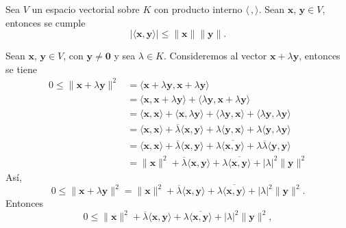 \begin{theorem}{}{}
     Sea $V$ un espacio vectorial sobre $K$ con producto interno $\langle \, , \rangle$. Sean $\mathbf{x}$, $\mathbf{y} \in V$, entonces se cumple
    $$| \langle \mathbf{x}, \mathbf{y} \rangle | \leq \| \mathbf{x} \| \| \mathbf{y} \|.$$

    \tcblower
    \demostracion Sean $\mathbf{x}$, $\mathbf{y} \in V$, con $\mathbf{y} \neq \mathbf{0}$ y sea $\lambda \in K$. Consideremos al vector $\mathbf{x} + \lambda \mathbf{y}$, entonces se tiene
    \begin{align*}
        0 \leq \| \mathbf{x} + \lambda \mathbf{y} \|^2 & = \langle \mathbf{x} + \lambda\mathbf{y}, \mathbf{x} + \lambda\mathbf{y} \rangle \\
        & = \langle \mathbf{x}, \mathbf{x} + \lambda \mathbf{y} \rangle + \langle \lambda \mathbf{y}, \mathbf{x} + \lambda\mathbf{y} \rangle \\
        & = \langle \mathbf{x}, \mathbf{x} \rangle + \langle \mathbf{x}, \lambda \mathbf{y} \rangle + \langle \lambda \mathbf{y}, \mathbf{x} \rangle + \langle \lambda \mathbf{y}, \lambda \mathbf{y} \rangle \\
        & = \langle \mathbf{x}, \mathbf{x} \rangle + \overline{\lambda} \langle \mathbf{x}, \mathbf{y} \rangle + \lambda \langle \mathbf{y}, \mathbf{x} \rangle + \lambda \langle \mathbf{y}, \lambda \mathbf{y} \rangle \\
        & = \langle \mathbf{x}, \mathbf{x} \rangle + \overline{\lambda} \langle \mathbf{x}, \mathbf{y} \rangle + \lambda \overline{\langle \mathbf{x}, \mathbf{y} \rangle} + \lambda\overline{\lambda} \langle \mathbf{y}, \mathbf{y} \rangle \\
        & = \| \mathbf{x} \|^2 + \overline{\lambda} \langle \mathbf{x}, \mathbf{y} \rangle + \lambda \overline{\langle \mathbf{x}, \mathbf{y} \rangle} + |\lambda|^2 \| \mathbf{y} \|^2
    \end{align*}
    Así,
    $$0 \leq \| \mathbf{x} + \lambda \mathbf{y} \|^2 = \| \mathbf{x} \|^2 + \overline{\lambda} \langle \mathbf{x}, \mathbf{y} \rangle + \lambda \overline{\langle \mathbf{x}, \mathbf{y} \rangle} + |\lambda|^2 \| \mathbf{y} \|^2.$$
    Entonces
    \begin{equation}
        0 \leq \| \mathbf{x} \|^2 + \overline{\lambda} \langle \mathbf{x}, \mathbf{y} \rangle + \lambda \overline{\langle \mathbf{x}, \mathbf{y} \rangle} + |\lambda|^2 \| \mathbf{y} \|^2, \label{desigualdad-cauchy}
    \end{equation}

\end{theorem}
